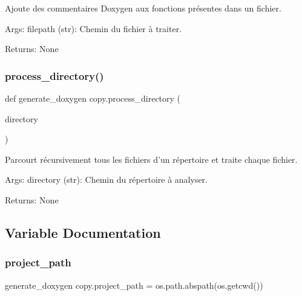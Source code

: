 \begin{DoxyVerb}Ajoute des commentaires Doxygen aux fonctions présentes dans un fichier.

Args:
    filepath (str): Chemin du fichier à traiter.

Returns:
    None
\end{DoxyVerb}
 \mbox{\label{namespacegenerate__doxygen_01copy_a64ea6a8881afb87c3158855bb52edb98}} 
\subsubsection{\texorpdfstring{process\+\_\+directory()}{process\_directory()}}
{\footnotesize\ttfamily def generate\+\_\+doxygen copy.\+process\+\_\+directory (\begin{DoxyParamCaption}\item[{}]{directory }\end{DoxyParamCaption})}

\begin{DoxyVerb}Parcourt récursivement tous les fichiers d'un répertoire et traite chaque fichier.

Args:
    directory (str): Chemin du répertoire à analyser.

Returns:
    None
\end{DoxyVerb}
 

\subsection{Variable Documentation}
\mbox{\label{namespacegenerate__doxygen_01copy_a9f73f05b8fb6d9519da03ba38d6ace52}} 
\subsubsection{\texorpdfstring{project\+\_\+path}{project\_path}}
{\footnotesize\ttfamily generate\+\_\+doxygen copy.\+project\+\_\+path = os.\+path.\+abspath(os.\+getcwd())}

